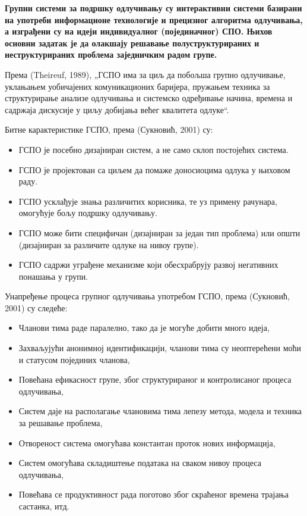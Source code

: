 \textbf{Групни системи за подршку одлучивању су интерактивни системи базирани на употреби информационе технологије и прецизног алгоритма одлучивања, а изграђени су на идеји индивидуалног (појединачног) СПО. Њихов основни задатак је да олакшају решавање полуструктурираних и неструктурираних проблема заједничким радом групе.}

Према (Theireuf, 1989), „ГСПО има за циљ да побољша групно одлучивање, уклањањем уобичајених комуникационих баријера, пружањем техника за структурирање анализе одлучивања и системско одређивање начина, времена и садржаја дискусије у циљу добијања већег квалитета одлуке“.

Битне карактеристике ГСПО, према (Сукновић, 2001) су:

\begin{itemize}
  \item ГСПО је посебно дизајниран систем, а не само склоп постојећих система.
  \item ГСПО је пројектован са циљем да помаже доносиоцима одлука у њиховом раду.
  \item ГСПО усклађује знања различитих корисника, те уз примену рачунара, омогућује бољу подршку одлучивању.
  \item ГСПО може бити специфичан (дизајниран за један тип проблема) или општи (дизајниран за различите одлуке на нивоу групе).
  \item ГСПО садржи уграђене механизме који обесхрабрују развој негативних понашања у групи.
\end{itemize}
Унапређење процеса групног одлучивања употребом ГСПО, према (Сукновић, 2001) су следеће:

\begin{itemize}
  \item Чланови тима раде паралелно, тако да је могуће добити много идеја,
  \item Захваљујући анонимној идентификацији, чланови тима су неоптерећени моћи и статусом појединих чланова,
  \item Повећана ефикасност групе, због структурираног и контролисаног процеса одлучивања,
  \item Систем даје на располагање члановима тима лепезу метода, модела и техника за решавање проблема,
  \item Отвореност система омогућава константан проток нових информација,
  \item Систем омогућава складиштење података на сваком нивоу процеса одлучивања,
  \item Повећава се продуктивност рада поготово због скраћеног времена трајања састанка, итд.
\end{itemize}

